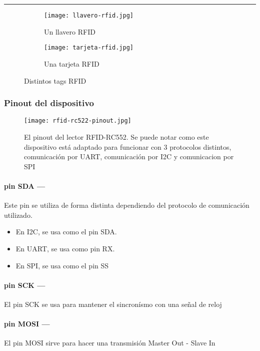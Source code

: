 \documentclass[../informe_krapp.tex]{subfiles}
\begin{document}
\begin{center}
	\rule{0.9\textwidth}{0.5pt}
\end{center}

\begin{figure}[H]
	\centering
	\begin{subfigure}{0.4\textwidth}
		\texttt{[image: llavero-rfid.jpg]}
		\caption{Un llavero RFID}
	\end{subfigure}
	\begin{subfigure}{0.4\textwidth}
		\texttt{[image: tarjeta-rfid.jpg]}
		\caption{Una tarjeta RFID}
	\end{subfigure}
	\caption{Distintos tags RFID}
\end{figure}

\clearpage
\subsubsection{Pinout del dispositivo}

\begin{wrapfigure}{r}{0in}
	\centering
	\texttt{[image: rfid-rc522-pinout.jpg]}
	\caption{El pinout del lector RFID-RC552.
		Se puede notar como este dispositivo está adaptado para funcionar con 3 protocolos
		distintos, comunicación por UART, comunicación por I2C y comunicacion por SPI}
\end{wrapfigure}


\paragraph{pin SDA ---}
Este pin se utiliza de forma distinta dependiendo del protocolo
de comunicación utilizado.
\begin{itemize}
	\item En I2C, se usa como el pin SDA.
	\item En UART, se usa como pin RX.
	\item En SPI, se usa como el pin SS
\end{itemize}

\paragraph{pin SCK ---}
El pin SCK se usa para mantener el sincronísmo con una señal de reloj

\paragraph{pin MOSI ---}
El pin MOSI sirve para hacer una transmisión Master Out - Slave In
\end{document}
